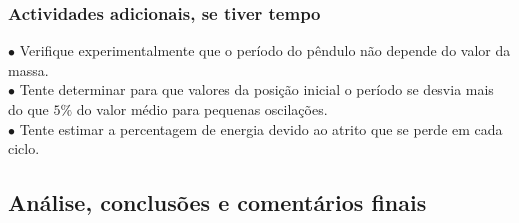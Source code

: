 \documentclass[a4paper,12pt]{article}      %
\begin{document}
\subsubsection*{\sf Actividades adicionais, se tiver tempo}
 \begin{flushleft}
	 $\bullet$ Verifique experimentalmente que o período do pêndulo não depende do valor da massa.\\
	 $\bullet$ Tente determinar para que valores da posição inicial o período se desvia mais do que $ 5 \%$  do valor médio para pequenas oscilações.\\
	 $\bullet$ Tente estimar a percentagem de energia devido ao atrito que se perde em cada ciclo.
\end{flushleft} 

\newpage

 \subsection*{\sf Análise, conclusões e comentários finais}
\noindent\underline{\makebox[\textwidth][r]{~}} \\
\noindent\underline{\makebox[\textwidth][r]{~}} \\
\noindent\underline{\makebox[\textwidth][r]{~}} \\
\noindent\underline{\makebox[\textwidth][r]{~}} \\
\noindent\underline{\makebox[\textwidth][r]{~}} \\
\noindent\underline{\makebox[\textwidth][r]{~}} \\
\noindent\underline{\makebox[\textwidth][r]{~}} \\
\noindent\underline{\makebox[\textwidth][r]{~}} \\
\noindent\underline{\makebox[\textwidth][r]{~}} \\
\noindent\underline{\makebox[\textwidth][r]{~}} \\
\noindent\underline{\makebox[\textwidth][r]{~}} \\
\noindent\underline{\makebox[\textwidth][r]{~}} \\
\noindent\underline{\makebox[\textwidth][r]{~}} \\
\noindent\underline{\makebox[\textwidth][r]{~}} \\
\noindent\underline{\makebox[\textwidth][r]{~}} \\
\noindent\underline{\makebox[\textwidth][r]{~}} \\
\noindent\underline{\makebox[\textwidth][r]{~}} \\
\noindent\underline{\makebox[\textwidth][r]{~}} \\
\noindent\underline{\makebox[\textwidth][r]{~}} \\
\end{document}
